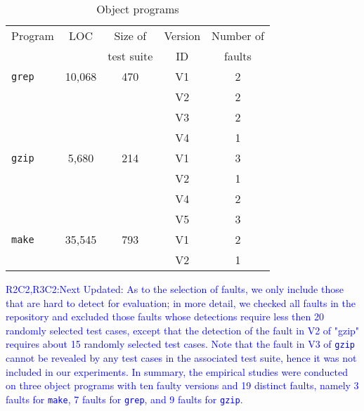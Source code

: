 \documentclass[10pt,journal,compsoc]{IEEEtran}
\begin{document}
\begin{table}
\caption{Object programs}
\label{tab:objects}
\centering
\begin{tabular}{|l|c|c|c|c|} \hline
Program				& LOC			& Size of			& Version	& Number of	\\
        			&					& test suite	& ID			& faults		\\ \hline
\texttt{grep}	    & 10,068	        & 470					& V1			& 2					\\ \cline{4-5}
        			&					& 						& V2			& 2					\\ \cline{4-5}
        			&					& 						& V3			& 2					\\ \cline{4-5}
        			&					& 						& V4			& 1					\\ \hline
\texttt{gzip}	    & 5,680		        & 214					& V1			& 3					\\ \cline{4-5}
        			&					& 						& V2			& 1					\\ \cline{4-5}
        			&					& 						& V4			& 2					\\ \cline{4-5}
        			&					& 						& V5			& 3					\\ \hline
\texttt{make}	    & 35,545	        & 793					& V1			& 2					\\ \cline{4-5}
        			&					& 						& V2			& 1					\\ \hline
\end{tabular}
\end{table}


\textcolor{blue}{R2C2,R3C2:Next Updated: As to the selection of faults, we only include those that are hard to detect for evaluation; in more detail, we checked all faults in the repository and excluded those faults whose detections require less then 20 randomly selected test cases, except that the detection of the fault in V2 of "gzip" requires about 15 randomly selected test cases. Note that the fault in V3 of \texttt{gzip} cannot be revealed by any test cases in the associated test suite, hence it was not included in our experiments.
In summary, the empirical studies were conducted on three object programs with ten faulty versions and 19 distinct faults, namely 3 faults for \texttt{make}, 7 faults for \texttt{grep}, and 9 faults for \texttt{gzip}.}
\end{document}
